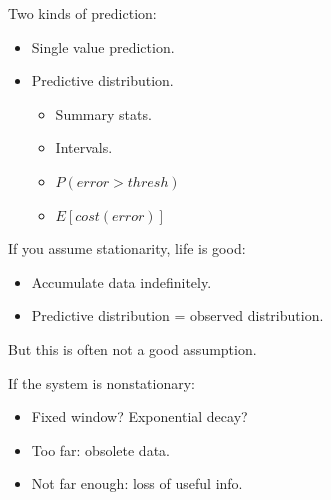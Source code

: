 \documentclass[pdf,letterpaper,allen]{prosper}
\begin{document}
\begin{slide}{}

Two kinds of prediction:

\begin{itemize}

\item Single value prediction.

\item Predictive distribution.

    \begin{itemize}

    \item Summary stats.
    \item Intervals.
    \item $P(error > thresh)$
    \item $E[cost(error)]$

    \end{itemize}

\end{itemize}
\end{slide}


\begin{slide}{}

If you assume stationarity, life is good:

\begin{itemize}

\item Accumulate data indefinitely.

\item Predictive distribution = observed distribution.

\end{itemize}

But this is often not a good assumption.

\end{slide}




\begin{slide}{}

If the system is nonstationary:

\begin{itemize}

\item Fixed window?  Exponential decay?

\item Too far: obsolete data.

\item Not far enough: loss of useful info.

\end{itemize}

\end{slide}
\end{document}
